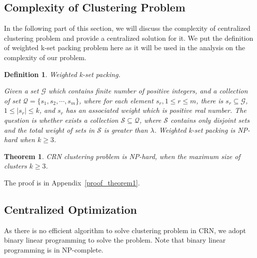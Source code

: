 \documentclass[journal,comsoc]{IEEEtran}
\theoremstyle{mytheoremstyle}
\newtheorem{theorem}{Theorem}[section]
\theoremstyle{mytheoremstyle}
\theoremstyle{mytheoremstyle}
\newtheorem{mydef}{Definition}%
\begin{document}
\subsection{Complexity of Clustering Problem}
In the following part of this section, we will discuss the complexity of centralized clustering problem and provide a centralized solution for it.
We put the definition of weighted k-set packing problem here as it will be used in the analysis on the complexity of our problem.

\begin{mydef}
\label{def_kset_packing}
\textit{Weighted k-set packing.} 

Given a set $\mathcal{G}$ which contains finite number of positive integers, and a collection of set $\mathcal{Q}=\{s_1,s_2,\cdots,s_m\}$, where for each element $s_r, 1\leq r \leq m$, there is $s_r\subseteq \mathcal{G}$, $ 1\leq|s_r| \leq k$, and $s_r$ has an associated weight which is positive real number.
The question is whether exists a collection $\mathcal{S}\subseteq \mathcal{Q}$, where $\mathcal{S}$ contains only disjoint sets and the total weight of sets in $\mathcal{S}$ is greater than $\lambda$.
Weighted k-set packing is NP-hard when $k\geqslant 3$.~\cite{Computers_a_Intractability}
\end{mydef}

\begin{theorem}
\label{theorem1}
CRN clustering problem is NP-hard, when the maximum size of clusters $k\geqslant 3$.
\end{theorem}
The proof is in Appendix~\ref{proof_theorem1}.



\subsection{Centralized Optimization}

As there is no efficient algorithm to solve clustering problem in CRN, we adopt binary linear programming to solve the problem.
Note that binary linear programming is in NP-complete.

\end{document}
